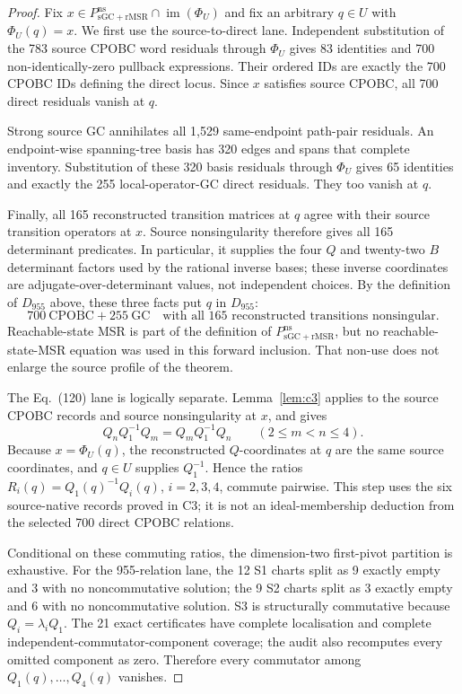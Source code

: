 \documentclass[11pt]{article}
\theoremstyle{definition}
\theoremstyle{remark}
\newcommand{\im}{\operatorname{im}}
\begin{document}
\begin{proof}
Fix
\(x\in P_{\mathrm{sGC+rMSR}}^{\mathrm{ns}}\cap\im(\Phi_U)\) and fix an
arbitrary \(q\in U\) with \(\Phi_U(q)=x\).  We first use the
source-to-direct lane.  Independent substitution of the 783 source CPOBC word
residuals through \(\Phi_U\) gives 83 identities and 700 non-identically-zero
pullback expressions.  Their ordered IDs are exactly the 700 CPOBC IDs defining the
direct locus.  Since \(x\) satisfies source CPOBC, all 700 direct residuals
vanish at \(q\).

Strong source GC annihilates all 1,529 same-endpoint path-pair residuals.  An
endpoint-wise spanning-tree basis has 320 edges and spans that complete
inventory.  Substitution of these 320 basis residuals through \(\Phi_U\)
gives 65 identities and exactly the 255 local-operator-GC direct residuals.
They too vanish at \(q\).

Finally, all 165 reconstructed transition matrices at \(q\) agree with their
source transition operators at \(x\).  Source nonsingularity therefore gives
all 165 determinant predicates.  In particular, it supplies the four \(Q\)
and twenty-two \(B\) determinant factors used by the rational inverse bases;
these inverse coordinates are adjugate-over-determinant values, not
independent choices.  By the definition of \(D_{955}\) above, these three facts put
\(q\) in \(D_{955}\):
\[
  700\ \mathrm{CPOBC}+255\ \mathrm{GC}
  \quad\text{with all 165 reconstructed transitions nonsingular}.
\]
Reachable-state MSR is part of the definition of
\(P_{\mathrm{sGC+rMSR}}^{\mathrm{ns}}\), but no reachable-state-MSR equation
was used in this forward inclusion.  That non-use does not enlarge the
source profile of the theorem.

The Eq.~(120) lane is logically separate.  Lemma~\ref{lem:c3} applies to the
source CPOBC records and source nonsingularity at \(x\), and gives
\[
  Q_nQ_1^{-1}Q_m=Q_mQ_1^{-1}Q_n
  \qquad(2\leq m<n\leq4).
\]
Because \(x=\Phi_U(q)\), the reconstructed \(Q\)-coordinates at \(q\) are the
same source coordinates, and \(q\in U\) supplies \(Q_1^{-1}\).  Hence the
ratios \(R_i(q)=Q_1(q)^{-1}Q_i(q)\), \(i=2,3,4\), commute pairwise.  This step
uses the six source-native records proved in C3; it is not an ideal-membership
deduction from the selected 700 direct CPOBC relations.

Conditional on these commuting ratios, the dimension-two first-pivot
partition is exhaustive.  For the 955-relation lane, the 12 S1 charts split
as 9 exactly empty and 3 with no noncommutative solution; the 9 S2 charts
split as 3 exactly empty and 6 with no noncommutative solution.  S3 is
structurally commutative because
\(Q_i=\lambda_iQ_1\).  The 21 exact certificates have complete localisation
and complete independent-commutator-component coverage; the audit also
recomputes every omitted component as zero.  Therefore every commutator among
\(Q_1(q),\ldots,Q_4(q)\) vanishes.


\end{proof}
\end{document}

